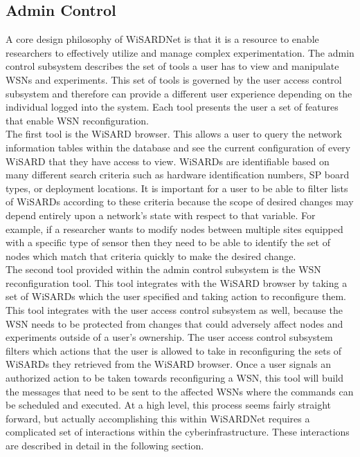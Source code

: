 \subsection{Admin Control}
A core design philosophy of WiSARDNet is that it is a resource to enable researchers to effectively utilize and manage complex experimentation. The admin control subsystem describes the set of tools a user has to view and manipulate WSNs and experiments. This set of tools is governed by the user access control subsystem and therefore can provide a different user experience depending on the individual logged into the system. Each tool presents the user a set of features that enable WSN reconfiguration.\\ 

The first tool is the WiSARD browser. This allows a user to query the network information tables within the database and see the current configuration of every WiSARD that they have access to view. WiSARDs are identifiable based on many different search criteria such as hardware identification numbers, SP board types, or deployment locations. It is important for a user to be able to filter lists of WiSARDs according to these criteria because the scope of desired changes may depend entirely upon a network's state with respect to that variable. For example, if a researcher wants to modify nodes between multiple sites equipped with a specific type of sensor then they need to be able to identify the set of nodes which match that criteria quickly to make the desired change.\\ 

The second tool provided within the admin control subsystem is the WSN reconfiguration tool. This tool integrates with the WiSARD browser by taking a set of WiSARDs which the user specified and taking action to reconfigure them. This tool integrates with the user access control subsystem as well, because the WSN needs to be protected from changes that could adversely affect nodes and experiments outside of a user's ownership. The user access control subsystem filters which actions that the user is allowed to take in reconfiguring the sets of WiSARDs they retrieved from the WiSARD browser. Once a user signals an authorized action to be taken towards reconfiguring a WSN, this tool will build the messages that need to be sent to the affected WSNs where the commands can be scheduled and executed. At a high level, this process seems fairly straight forward, but actually accomplishing this within WiSARDNet requires a complicated set of interactions within the cyberinfrastructure. These interactions are described in detail in the following section.


